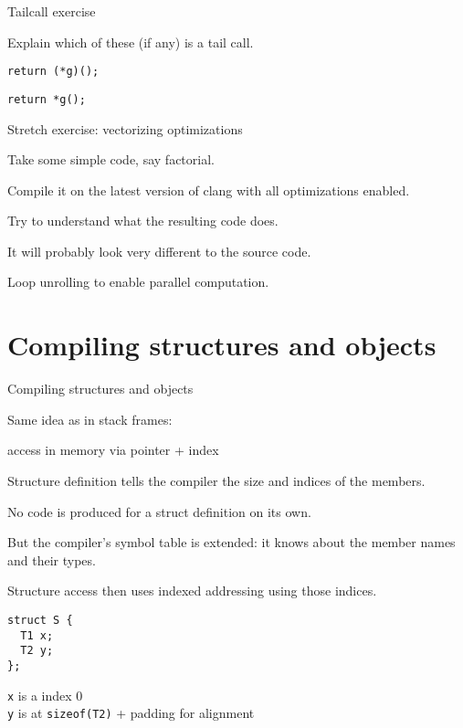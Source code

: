 \documentclass[landscape]{beamer}
\begin{document}
\begin{frame}[fragile]{Tailcall exercise}

Explain which of these (if any) is a tail call.

\begin{verbatim}
return (*g)();
\end{verbatim}
%
\begin{verbatim}
return *g();
\end{verbatim}
\end{frame}


\begin{frame}{Stretch exercise: vectorizing optimizations}

Take some simple code, say factorial.

Compile it on the latest version of clang with all optimizations enabled.

Try to understand what the resulting code does.

It will probably look very different to the source code.

Loop unrolling to enable parallel computation.

\end{frame}

\section{Compiling structures and objects}

\begin{frame}[fragile]{Compiling structures and objects}

Same idea as in stack frames:

access in memory via
pointer + index

Structure \alert{definition} tells the compiler the size and indices of the members.

No code is produced for a struct definition on its own. 

But the compiler's symbol table is extended: it knows about the member names and their types.

Structure \alert{access} then uses indexed addressing using those indices.

\begin{verbatim}
struct S {
  T1 x;
  T2 y;
};
\end{verbatim}
\pause
\texttt x is a index 0\\
 \texttt y is at \texttt{sizeof(T2)} + padding for alignment
\end{frame}
\end{document}
